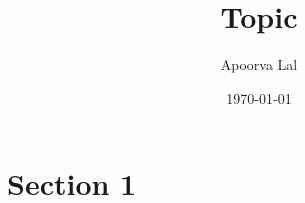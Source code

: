 \documentclass[11pt, reqno]{amsart}
\title{Topic}
\author{Apoorva Lal}
\date{\today}
\begin{document}
\maketitle
\section{Section 1}


\renewcommand{\mkbibnamefamily}[1]{\textsc{#1}} %
\printbibliography
\end{document}
